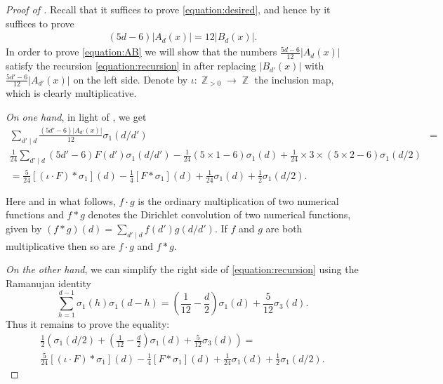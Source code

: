 \documentclass[reqno, 11pt]{amsart}
\DeclareMathOperator{\Z}{\mathbb{Z}}
\begin{document}
\begin{proof}[Proof of ]
Recall that it suffices to prove \eqref{equation:desired}, and hence by  it suffices to prove 
\begin{align}
    \label{equation:AB}
    (5d-6)|A_{d}(x)| = 12|B_{d}(x)|.
\end{align}
In order to prove \eqref{equation:AB} we will show that the numbers $\frac{5d-6}{12}|A_{d}(x)|$ satisfy the recursion \eqref{equation:recursion} in  after replacing $|B_{d'}(x)|$ with $\frac{5d'-6}{12}|A_{d'}(x)|$ on the left side.  Denote by $\iota: \Z_{>0} \to \Z$ the inclusion map, which is clearly multiplicative.

\emph{On one hand}, in light of , we get 
\begin{align}
    \label{equation:rewriteA} \sum_{d' \mid d}\frac{(5d'-6)|A_{d'}(x)|}{12}\sigma_{1}(d/d') &=\\
    \frac{1}{24}\sum_{d' \mid d} (5d'-6)F(d')\sigma_{1}(d/d')  - \frac{1}{24}(5 \times 1 - 6)\sigma_{1}(d) + \frac{1}{24}\times 3 \times (5 \times 2 - 6)\sigma_{1}(d/2)\\
    = \frac{5}{24}\left[ (\iota \cdot F) * \sigma_{1} \right](d) - \frac{1}{4}\left[ F * \sigma_{1} \right](d) + \frac{1}{24}\sigma_{1}(d) + \frac{1}{2}\sigma_{1}(d/2).
\end{align}

Here and in what follows, $f \cdot g$ is the ordinary multiplication of two numerical functions and $f*g$ denotes the Dirichlet convolution of two numerical functions, given by $(f * g)(d) = \sum_{d' \mid d}f(d')g(d/d')$.  If $f$ and $g$ are both  multiplicative then so are $f\cdot g$ and $f*g$. 

\emph{On the other hand}, we can simplify the right side of \eqref{equation:recursion} using the Ramanujan identity 
\[\sum_{h=1}^{d-1}\sigma_{1}(h)\sigma_{1}(d-h) = \left(\frac{1}{12}-\frac{d}{2}\right)\sigma_{1}(d)+ \frac{5}{12}\sigma_{3}(d).\]  Thus it remains to prove the equality: 
\begin{align*}
    \frac{1}{2}\left(\sigma_{1}(d/2) + \left(\frac{1}{12}-\frac{d}{2}\right)\sigma_{1}(d)+ \frac{5}{12}\sigma_{3}(d)\right) = \\
    \frac{5}{24}\left[(\iota \cdot F) * \sigma_{1} \right](d) - \frac{1}{4}\left[ F * \sigma_{1} \right](d) + \frac{1}{24}\sigma_{1}(d) + \frac{1}{2}\sigma_{1}(d/2).
\end{align*}


\end{proof}
\end{document}
